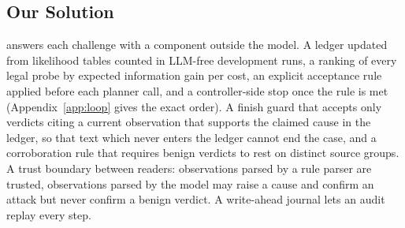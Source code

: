 \subsection{Our Solution}
\hesp{} answers each challenge with a component outside the model.  A ledger updated from likelihood tables counted in LLM-free development runs, a ranking of every legal probe by expected information gain per cost, an explicit acceptance rule applied before each planner call, and a controller-side stop once the rule is met (Appendix~\ref{app:loop} gives the exact order).  A finish guard that accepts only verdicts citing a current observation that supports the claimed cause in the ledger, so that text which never enters the ledger cannot end the case, and a corroboration rule that requires benign verdicts to rest on distinct source groups.  A trust boundary between readers: observations parsed by a rule parser are trusted, observations parsed by the model may raise a cause and confirm an attack but never confirm a benign verdict. A write-ahead journal lets an audit replay every step.
